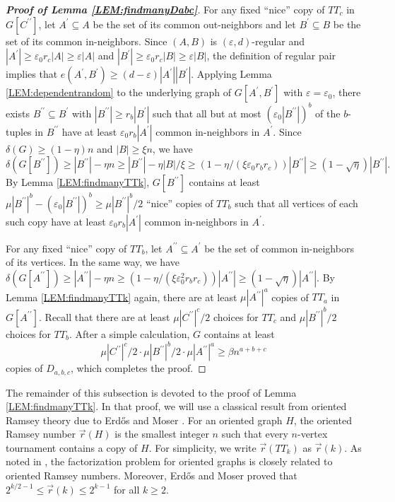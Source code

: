 \documentclass[11pt,a4paper,reqno]{amsart}
\theoremstyle{definition} %
\begin{document}
\begin{proof}[\textbf{Proof of Lemma \ref{LEM:findmanyDabc}}]
For any fixed ``nice'' copy of $TT_c$ in $G[C^{\prime\prime}]$, let $A^\prime\subseteq A$ be the set of its common out-neighbors and let $B^\prime \subseteq B$ be the set of its common in-neighbors. Since $(A,B)$ is $(\varepsilon,d)$-regular and
$|A^\prime| \geqslant \varepsilon_0 r_c |A|\geqslant \varepsilon |A|$ and
$|B^\prime| \geqslant \varepsilon_0 r_c |B|\geqslant \varepsilon |B|$,
the definition of regular pair implies that
$e(A^\prime,B^\prime) \geqslant (d-\varepsilon) |A^\prime||B^\prime|$.
Applying Lemma \ref{LEM:dependentrandom} to the underlying graph of $G[A^\prime,B^\prime]$ with $\varepsilon =\varepsilon_0$, there exists $B^{\prime\prime}\subseteq B^\prime$ with $|B^{\prime\prime}| \geqslant r_b |B^\prime|$ such that all but at most $(\varepsilon_0 |B^{\prime\prime}|)^b$ of the $b$-tuples in $B^{\prime\prime}$ have at least $\varepsilon_0 r_b|A^\prime|$ common in-neighbors in $A^\prime$. Since $\delta(G)\geqslant (1-\eta)n$ and $|B|\geqslant\xi n$, we have
$$\delta(G[B^{\prime\prime}])\geqslant  |B^{\prime\prime}|- \eta n\geqslant |B^{\prime\prime}|- \eta|B|/\xi \geqslant (1-\eta /(\xi\varepsilon_0 r_br_c))|B^{\prime\prime}|\geqslant (1-\sqrt \eta)|B^{\prime\prime}|.$$
By Lemma \ref{LEM:findmanyTTk}, $G[B^{\prime\prime}]$ contains at least
$\mu |B^{\prime\prime}|^b- (\varepsilon_0|B^{\prime\prime}|)^b \geqslant \mu |B^{\prime\prime}|^b/2$
``nice'' copies of $TT_b$ such that all vertices of each such copy have at least $\varepsilon_0 r_b|A^\prime|$ common in-neighbors in $A^\prime$.
    
For any fixed ``nice'' copy of $TT_b$, let $A^{\prime\prime}\subseteq A^\prime$ be the set of common in-neighbors of its vertices. In the same way, we have
$\delta(G[A^{\prime\prime}])\geqslant |A^{\prime\prime}|-\eta n \geqslant (1-\eta /(\xi \varepsilon_0^2 r_br_c))|A^{\prime\prime}|\geqslant (1-\sqrt \eta)|A^{\prime\prime}|$.
By Lemma \ref{LEM:findmanyTTk} again, there are at least $\mu |A^{\prime\prime}|^a$ copies of $TT_a$ in $G[A^{\prime\prime}]$. Recall that there are at least $\mu |C^{\prime\prime}|^c/2$ choices for $TT_c$ and $\mu |B^{\prime\prime}|^b/2$ choices for $TT_b$. After a simple calculation, $G$ contains at least
$$\mu |C^{\prime\prime}|^c/2 \cdot\mu |B^{\prime\prime}|^b/2 \cdot\mu |A^{\prime\prime}|^a \geqslant \beta n^{a+b+c}$$
copies of $D_{a,b,c}$, which completes the proof.
\end{proof} 

The remainder of this subsection is devoted to the proof of Lemma \ref{LEM:findmanyTTk}. In that proof, we will use a classical result from oriented Ramsey theory due to Erd\H{o}s and Moser \cite{erdosKMIHAS9}. For an oriented graph $H$, the oriented Ramsey number $\overrightarrow{r}(H)$ is the smallest integer $n$ such that every $n$-vertex tournament contains a copy of $H$. For simplicity, we write $\overrightarrow{r}(TT_k)$ as $\overrightarrow{r}(k)$. As noted in \cite{debiasioSJDM35,treglownJGT69}, the factorization problem for oriented graphs is closely related to oriented Ramsey numbers. Moreover, Erd\H{o}s and Moser \cite{erdosKMIHAS9} proved that
$2^{k/2-1}\leqslant \overrightarrow{r}(k)\leqslant 2^{k-1}$ for all $k\geqslant 2$.
\end{document}
